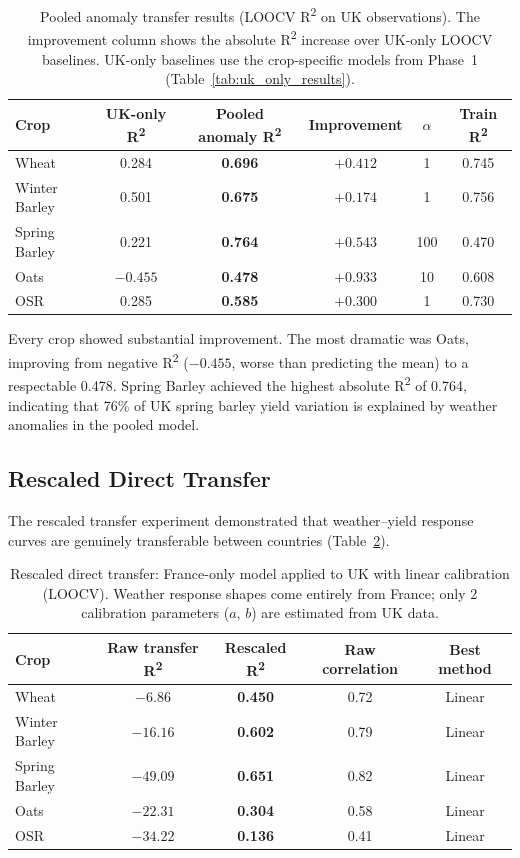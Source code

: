 \documentclass[12pt,a4paper]{report}
\newcommand{\rsq}{R\textsuperscript{2}}
\begin{document}
\begin{table}[H]
\centering
\caption{Pooled anomaly transfer results (LOOCV \rsq{} on UK observations). The improvement column shows the absolute \rsq{} increase over UK-only LOOCV baselines. UK-only baselines use the crop-specific models from Phase~1 (Table~\ref{tab:uk_only_results}).}
\label{tab:anomaly_results}
\begin{tabular}{lccccc}
\toprule
\textbf{Crop} & \textbf{UK-only \rsq{}} & \textbf{Pooled anomaly \rsq{}} & \textbf{Improvement} & \textbf{$\alpha$} & \textbf{Train \rsq{}} \\
\midrule
Wheat & 0.284 & \textbf{0.696} & $+0.412$ & 1 & 0.745 \\
Winter Barley & 0.501 & \textbf{0.675} & $+0.174$ & 1 & 0.756 \\
Spring Barley & 0.221 & \textbf{0.764} & $+0.543$ & 100 & 0.470 \\
Oats & $-0.455$ & \textbf{0.478} & $+0.933$ & 10 & 0.608 \\
OSR & 0.285 & \textbf{0.585} & $+0.300$ & 1 & 0.730 \\
\bottomrule
\end{tabular}
\end{table}

Every crop showed substantial improvement. The most dramatic was Oats, improving from negative \rsq{} ($-0.455$, worse than predicting the mean) to a respectable 0.478. Spring Barley achieved the highest absolute \rsq{} of 0.764, indicating that 76\% of UK spring barley yield variation is explained by weather anomalies in the pooled model.

\subsection{Rescaled Direct Transfer}

The rescaled transfer experiment demonstrated that weather--yield response curves are genuinely transferable between countries (Table~\ref{tab:rescaled_transfer}).

\begin{table}[H]
\centering
\caption{Rescaled direct transfer: France-only model applied to UK with linear calibration (LOOCV). Weather response shapes come entirely from France; only 2 calibration parameters ($a$, $b$) are estimated from UK data.}
\label{tab:rescaled_transfer}
\begin{tabular}{lcccc}
\toprule
\textbf{Crop} & \textbf{Raw transfer \rsq{}} & \textbf{Rescaled \rsq{}} & \textbf{Raw correlation} & \textbf{Best method} \\
\midrule
Wheat & $-6.86$ & \textbf{0.450} & 0.72 & Linear \\
Winter Barley & $-16.16$ & \textbf{0.602} & 0.79 & Linear \\
Spring Barley & $-49.09$ & \textbf{0.651} & 0.82 & Linear \\
Oats & $-22.31$ & \textbf{0.304} & 0.58 & Linear \\
OSR & $-34.22$ & \textbf{0.136} & 0.41 & Linear \\
\bottomrule
\end{tabular}
\end{table}
\end{document}
